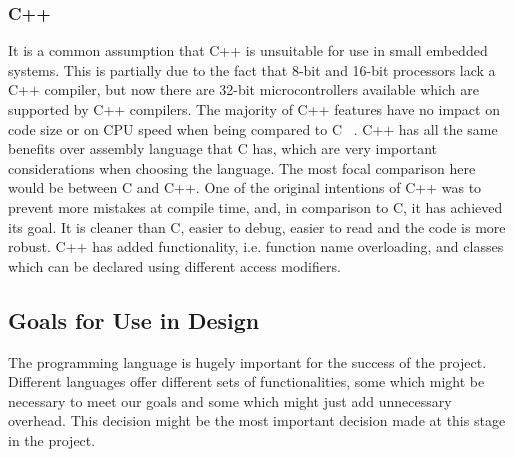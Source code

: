 \documentclass[10pt,letterpaper,onecolumn,journal]{IEEEtran}
\begin{document}
\subsubsection{C++}
It is a common assumption that C++ is unsuitable for use in small embedded systems. This is partially due to the fact that 8-bit and 16-bit processors lack a C++ compiler, but now there are 32-bit microcontrollers available which are supported by C++ compilers. The majority of C++ features have no impact on code size or on CPU speed when being compared to C ~\cite{herity2015}. C++ has all the same benefits over assembly language that C has, which are very important considerations when choosing the language. The most focal comparison here would be between C and C++. One of the original intentions of C++ was to prevent more mistakes at compile time, and, in comparison to C, it has achieved its goal. It is cleaner than C, easier to debug, easier to read and the code is more robust. C++ has added functionality, i.e. function name overloading, and classes which can be declared using different access modifiers.
\subsection{Goals for Use in Design}
The programming language is hugely important for the success of the project. Different languages offer different sets of functionalities, some which might be necessary to meet our goals and some which might just add unnecessary overhead. This decision might be the most important decision made at this stage in the project.
\end{document}
